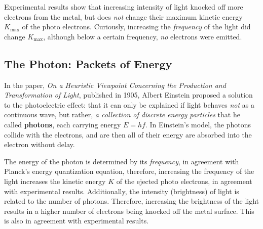 \begin{figure}[ht]
  \centering
\end{figure}
Experimental results show that increasing intensity of light knocked off more
electrons from the metal, but does \emph{not} change their maximum kinetic
energy $K_\text{max}$ of the photo electrons. Curiously, increasing the
\emph{frequency} of the light did change $K_\text{max}$, although below a
certain frequency, \emph{no} electrons were emitted.




%




\subsection{The Photon: Packets of Energy}
In the paper, \emph{On a Heuristic Viewpoint Concerning the Production and
Transformation of Light}, published in 1905, Albert Einstein proposed a
solution to the photoelectric effect: that it can only be explained if light
behaves \emph{not} as a continuous wave, but rather, \emph{a collection of
discrete energy particles} that he called \textbf{photons}, each carrying energy
$E=hf$. In Einstein's model, the photons collide with the electrons, and are
then all of their energy are absorbed into the electron without delay.

The energy of the photon is determined by its \emph{frequency}, in agreement
with Planck's energy quantization equation, therefore, increasing the frequency
of the light increases the kinetic energy $K$ of the ejected photo electrons,
in agreement with experimental results. Additionally, the intensity
(brightness) of light is related to the number of photons. Therefore,
increasing the brightness of the light results in a higher number of electrons
being knocked off the metal surface. This is also in agreement with
experimental results.

